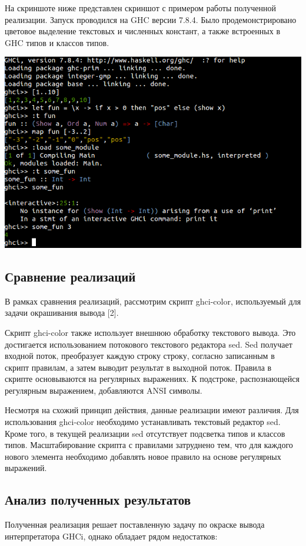На скриншоте ниже представлен скриншот с примером работы полученной реализации. Запуск проводился на GHC версии 7.8.4. Было продемонстрировано цветовое выделение текстовых и численных констант, а также встроенных в GHC типов и классов типов.


\centerline{\includegraphics[scale=0.75]{img/example.png}}
\subsection{Сравнение реализаций}
В рамках сравнения реализаций, рассмотрим скрипт ghci-color, используемый для задачи окрашивания вывода [2].

Скрипт ghci-color также использует внешнюю обработку текстового вывода. Это достигается использованием потокового текстового редактора sed. Sed получает входной поток, преобразует каждую строку строку, согласно записанным в скрипт правилам, а затем выводит результат в выходной поток. Правила в скрипте основываются на регулярных выражениях. К подстроке, распознающейся регулярным выражением, добавляются ANSI символы.

Несмотря на схожий принцип действия, данные реализации имеют различия. Для использования ghci-color необходимо устанавливать текстовый редактор sed. Кроме того, в текущей реализации sed отсутствует подсветка типов и классов типов. Масштабирование скрипта с правилами затруднено тем, что для каждого нового элемента необходимо добавлять новое правило на основе регулярных выражений.

\subsection{Анализ полученных результатов}
Полученная реализация решает поставленную задачу по окраске вывода интерпретатора GHCi, однако обладает рядом недостатков:

